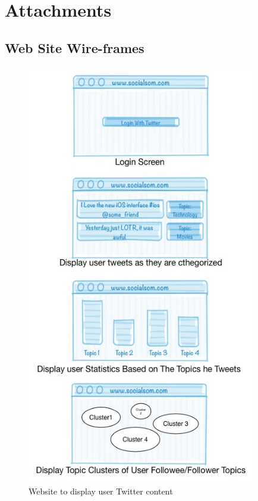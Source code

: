 
\section{Attachments} %
\label{sec:attachments}

\subsection{Web Site Wire-frames} %
\label{sec:web_site_wire_frames}
\begin{figure}[tb]
  \begin{center}
    \includegraphics[width=10cm]{images/9_wireframes}
  \end{center}
  \caption{Website to display user Twitter content}
  \label{fig:wireframes}
\end{figure}


